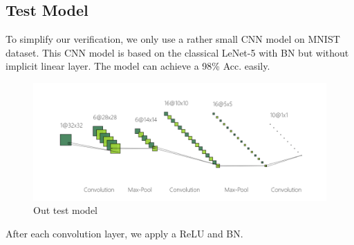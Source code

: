 \subsection{Test Model}

To simplify our verification, we only use a rather small CNN model on MNIST dataset. This CNN model is based on the classical LeNet-5 with BN but without implicit linear layer. The model can achieve a 98\% Acc. easily.

\begin{figure}[!htb]
    \centering
    \includegraphics[width=\columnwidth]{../figures/net.png}
    \caption{Out test model}
    \label{fig:net}
\end{figure}

After each convolution layer, we apply a ReLU and BN.